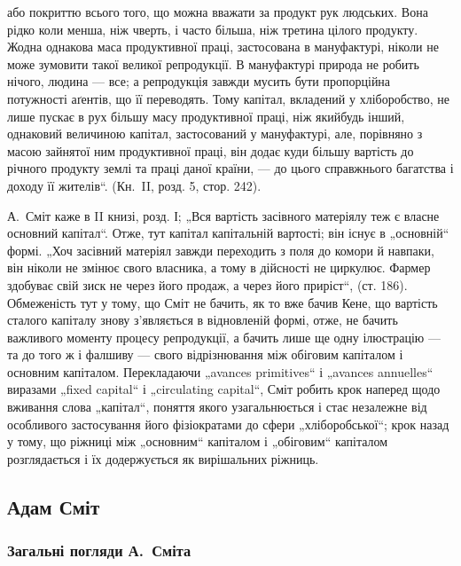 \parcont{}  %
або покриттю всього того, що можна вважати за продукт рук людських.
Вона рідко коли менша, ніж чверть, і часто більша, ніж третина цілого
продукту. Жодна однакова маса продуктивної праці, застосована в мануфактурі,
ніколи не може зумовити такої великої репродукції. В мануфактурі
природа не робить нічого, людина — все; а репродукція завжди
мусить бути пропорційна потужності аґентів, що її переводять. Тому
капітал, вкладений у хліборобство, не лише пускає в рух більшу масу
продуктивної праці, ніж якийбудь інший, однаковий величиною капітал,
застосований у мануфактурі, але, порівняно з масою зайнятої ним продуктивної
праці, він додає куди більшу вартість до річного продукту
землі та праці даної країни, — до цього справжнього багатства і доходу
її жителів“. (Кн.~II, розд. 5, стор. 242).

А.~Сміт каже в II книзі, розд. І; „Вся вартість засівного матеріялу
теж є власне основний капітал“. Отже, тут капітал \deq{} капітальній вартості;
він існує в „основній“ формі. „Хоч засівний матеріял завжди переходить
з поля до комори й навпаки, він ніколи не змінює свого власника, а тому
в дійсності не циркулює. Фармер здобуває свій зиск не через його продаж,
а через його приріст“, (ст. 186). Обмеженість тут у тому, що Сміт
не бачить, як то вже бачив Кене, що вартість сталого капіталу знову
з’являється в відновленій формі, отже, не бачить важливого моменту
процесу репродукції, а бачить лише ще одну ілюстрацію — та до того ж
і фалшиву — свого відрізнювання між обіговим капіталом і основним
капіталом. Перекладаючи „avances primitives“ і „avances annuelles“
виразами „fixed capital“ і „circulating capital“, Сміт робить крок наперед
щодо вживання слова „капітал“, поняття якого узагальнюється і стає
незалежне від особливого застосування його фізіократами до сфери
„хліборобської“; крок назад у тому, що ріжниці між „основним“ капіталом
і „обіговим“ капіталом розглядається і їх додержується як вирішальних
ріжниць.

\subsection{Адам Сміт}

\subsubsection{Загальні погляди А.~Сміта}

